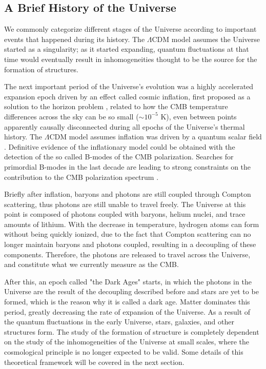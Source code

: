 \documentclass[openany,a4paper,12pt,oneside]{book}
\begin{document}
\begin{spacing}{1.5}
\subsection{A Brief History of the Universe}

We commonly categorize different stages of the Universe according to important events that happened during its history. The $\Lambda$CDM model assumes the Universe started as a singularity; as it started expanding, quantum fluctuations at that time would eventually result in inhomogeneities thought to be the source for the formation of structures.

The next important period of the Universe's evolution was a highly accelerated expansion epoch driven by an effect called cosmic inflation, first proposed as a solution to the horizon problem \cite{Guth81,linde82}, related to how the CMB temperature differences across the sky can be so small ($\sim 10^{-5}$ K), even between points apparently causally disconnected during all epochs of the Universe's thermal history. The $\Lambda$CDM model assumes inflation was driven by a quantum scalar field \cite{dodelson2020modern}. Definitive evidence of the inflationary model could be obtained with the detection of the so called B-modes of the CMB polarization. Searches for primordial B-modes in the last decade are leading to strong constraints on the contribution to the CMB polarization spectrum \cite{BMode_constraints}.

Briefly after inflation, baryons and photons are still coupled through Compton scattering, thus photons are still unable to travel freely. The Universe at this point is composed of photons coupled with baryons, helium nuclei, and trace amounts of lithium. With the decrease in temperature, hydrogen atoms can form without being quickly ionized, due to the fact that Compton scattering can no longer maintain baryons and photons coupled, resulting in a decoupling of these components. Therefore, the photons are released to travel across the Universe, and constitute what we currently measure as the CMB.

After this, an epoch called "the Dark Ages" starts, in which the photons in the Universe are the result of the decoupling described before and stars are yet to be formed, which is the reason why it is called a dark age. Matter dominates this period, greatly decreasing the rate of expansion of the Universe. As a result of the quantum fluctuations in the early Universe, stars, galaxies, and other structures form. The study of the formation of structure is completely dependent on the study of the inhomogeneities of the Universe at small scales, where the cosmological principle is no longer expected to be valid. Some details of this theoretical framework will be covered in the next section.


\end{spacing}
\end{document}
